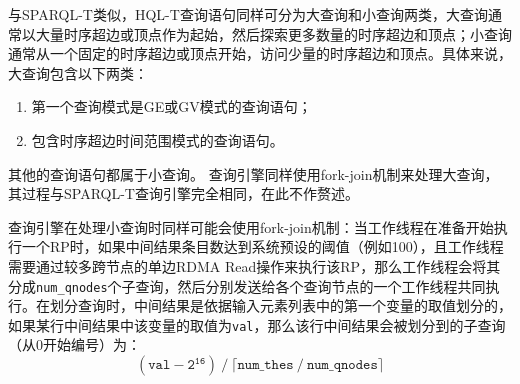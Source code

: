 与SPARQL-T类似，HQL-T查询语句同样可分为大查询和小查询两类，大查询通常以大量时序超边或顶点作为起始，然后探索更多数量的时序超边和顶点；小查询通常从一个固定的时序超边或顶点开始，访问少量的时序超边和顶点。具体来说，大查询包含以下两类：
\begin{enumerate}
    \item 第一个查询模式是GE或GV模式的查询语句；
    \item 包含时序超边时间范围模式的查询语句。
\end{enumerate}
其他的查询语句都属于小查询。
查询引擎同样使用fork-join机制来处理大查询，其过程与SPARQL-T查询引擎完全相同，在此不作赘述。

查询引擎在处理小查询时同样可能会使用fork-join机制：当工作线程在准备开始执行一个RP时，如果中间结果条目数达到系统预设的阈值（例如100），且工作线程需要通过较多跨节点的单边RDMA Read操作来执行该RP，那么工作线程会将其分成\texttt{num\_qnodes}个子查询，然后分别发送给各个查询节点的一个工作线程共同执行。在划分查询时，中间结果是依据输入元素列表中的第一个变量的取值划分的，如果某行中间结果中该变量的取值为\texttt{val}，那么该行中间结果会被划分到的子查询（从0开始编号）为：
\begin{equation}
    \mathtt{(val - 2^{16}) \ / \ \lceil num\_thes \ / \ num\_qnodes \rceil}
\end{equation}

